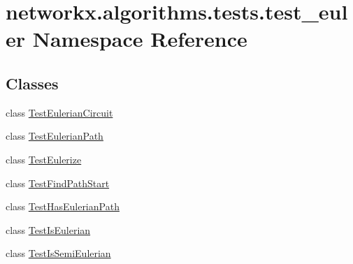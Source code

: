 \hypertarget{namespacenetworkx_1_1algorithms_1_1tests_1_1test__euler}{}\section{networkx.\+algorithms.\+tests.\+test\+\_\+euler Namespace Reference}
\label{namespacenetworkx_1_1algorithms_1_1tests_1_1test__euler}
\subsection*{Classes}
\begin{DoxyCompactItemize}
\item 
class \hyperlink{classnetworkx_1_1algorithms_1_1tests_1_1test__euler_1_1TestEulerianCircuit}{Test\+Eulerian\+Circuit}
\item 
class \hyperlink{classnetworkx_1_1algorithms_1_1tests_1_1test__euler_1_1TestEulerianPath}{Test\+Eulerian\+Path}
\item 
class \hyperlink{classnetworkx_1_1algorithms_1_1tests_1_1test__euler_1_1TestEulerize}{Test\+Eulerize}
\item 
class \hyperlink{classnetworkx_1_1algorithms_1_1tests_1_1test__euler_1_1TestFindPathStart}{Test\+Find\+Path\+Start}
\item 
class \hyperlink{classnetworkx_1_1algorithms_1_1tests_1_1test__euler_1_1TestHasEulerianPath}{Test\+Has\+Eulerian\+Path}
\item 
class \hyperlink{classnetworkx_1_1algorithms_1_1tests_1_1test__euler_1_1TestIsEulerian}{Test\+Is\+Eulerian}
\item 
class \hyperlink{classnetworkx_1_1algorithms_1_1tests_1_1test__euler_1_1TestIsSemiEulerian}{Test\+Is\+Semi\+Eulerian}
\end{DoxyCompactItemize}
